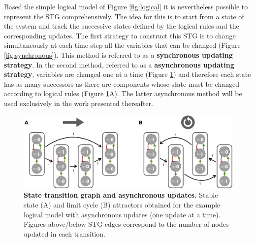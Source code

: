 \documentclass[a4paper,12pt,twoside,onecolumn,openright,final,oldfontcommands]{memoir}
\begin{document}
Based the simple logical model of Figure \ref{fig:logical} it is
nevertheless possible to represent the STG comprehensively. The idea for
this is to start from a state of the system and track the successive
states defined by the logical rules and the corresponding updates. The
first strategy to construct this STG is to change simultaneously at each
time step all the variables that can be changed (Figure
\ref{fig:synchronous}). This method is referred to as a
\textbf{synchronous updating strategy}. In the second method, referred
to as a \textbf{asynchronous updating strategy}, variables are changed
one at a time (Figure \ref{fig:asynchronous}) and therefore each state
has as many successors as there are components whose state must be
changed according to logical rules (Figure \ref{fig:asynchronous}A). The
latter asynchronous method will be used exclusively in the work
presented thereafter.

\begin{figure}

{\centering \includegraphics[width=0.9\linewidth]{fig/asynchronous} 

}

\caption[A simple example of a logical model]{\textbf{State transition graph and
asynchronous updates.} Stable state (A) and limit cycle (B) attractors
obtained for the example logical model with asynchronous updates (one
update at a time). Figures above/below STG edges correspond to the
number of nodes updated in each transition.}\label{fig:asynchronous}
\end{figure}
\end{document}
